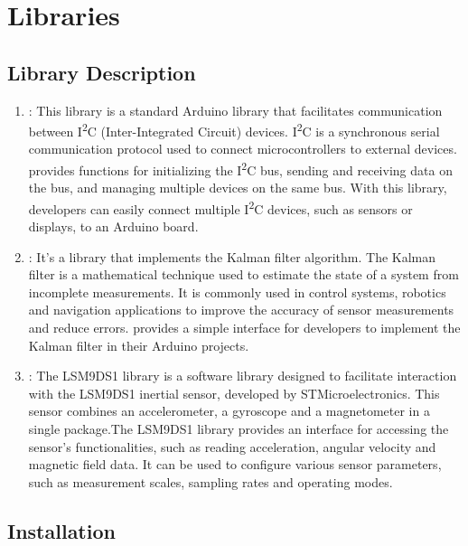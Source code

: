 \section{Libraries}

\subsection{Library Description}

\begin{enumerate}
	\item {} : 	This library is a standard Arduino library that facilitates communication between I\textsuperscript{2}C (Inter-Integrated Circuit) devices. I\textsuperscript{2}C is a synchronous serial communication protocol used to connect microcontrollers to external devices.  provides functions for initializing the I\textsuperscript{2}C bus, sending and receiving data on the bus, and managing multiple devices on the same bus. With this library, developers can easily connect multiple I\textsuperscript{2}C devices, such as sensors or displays, to an Arduino board. \cite{arduino_wire:2024}
	
	\item {} : It's a library that implements the Kalman filter algorithm. The Kalman filter is a mathematical technique used to estimate the state of a system from incomplete measurements. It is commonly used in control systems, robotics and navigation applications to improve the accuracy of sensor measurements and reduce errors.  provides a simple interface for developers to implement the Kalman filter in their Arduino projects. \cite{arduino_kalman:2024}

	\item {} :
	The LSM9DS1 library is a software library designed to facilitate interaction with the LSM9DS1 inertial sensor, developed by STMicroelectronics. This sensor combines an accelerometer, a gyroscope and a magnetometer in a single package.The LSM9DS1 library provides an interface for accessing the sensor's functionalities, such as reading acceleration, angular velocity and magnetic field data. It can be used to configure various sensor parameters, such as measurement scales, sampling rates and operating modes. \cite{arduino_lsm9ds1:2024}
	
	
\end{enumerate}

\subsection{Installation}

